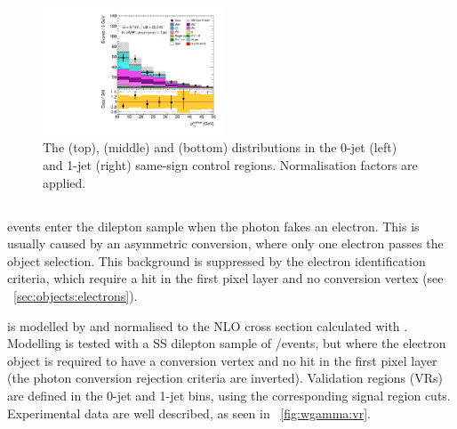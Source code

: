 \begin{figure}[p]
	\hfill
	\includegraphics[width=0.48\textwidth]{tex/backgrounds/emme_CutFRecoil_1jet_sscr_lepPtSubLead_zoom_mh125_lin}
	\caption{The \mt (top), \mll (middle) and \ptsubleadlep (bottom) distributions in the 
	0-jet (left) and 1-jet (right) same-sign control regions. Normalisation factors are 
	applied.}
	\label{fig:sscr}
\end{figure}



\subsection{\Wgamma}
\label{sec:diboson:wgamma}

\Wgamma events enter the dilepton sample when the photon fakes an electron. This is usually 
caused by an asymmetric \HepProcess{\Pphoton \HepTo \epluseminus} conversion, where only 
one electron passes the object selection. This background is suppressed by the electron 
identification criteria, which require a hit in the first pixel layer and no conversion 
vertex (see \Section~\ref{sec:objects:electrons}).

\Wgamma is modelled by \meps{\alpgen}{\fherwig} and normalised to the NLO cross section 
calculated with \mcfm. Modelling is tested with a SS dilepton sample of \emch/\mech events, 
but where the electron object is required to have a conversion vertex and no hit in the 
first pixel layer (\ie the photon conversion rejection criteria are inverted). Validation 
regions (VRs) are defined in the 0-jet and 1-jet bins, using the corresponding signal 
region cuts. Experimental data are well described, as seen in \Figure~\ref{fig:wgamma:vr}.

